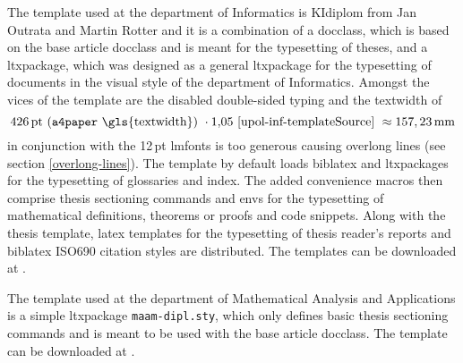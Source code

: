      The template used at the department of Informatics is KIdiplom from Jan Outrata and Martin Rotter and it is a combination of a \gls{docclass}, which is based on the base article \gls{docclass} and is meant for the typesetting of theses, and a \gls{ltxpackage}, which was designed as a general \gls{ltxpackage} for the typesetting of documents in the visual style of the department of Informatics. Amongst the vices of the template are the disabled double-sided typing \cite[lines~69--72]{upol-inf-templateSource} and the \gls{textwidth} of\begin{equation}
    426\text{\,pt}\text{ (\texttt{a4paper} \gls{textwidth}) }\cdot1{,}05\text{ \cite[line~81]{upol-inf-templateSource} }\approx157,23\text{\,mm}
  \end{equation} in conjunction with the 12\,pt \gls{lmfonts} is too generous \cite[lines~74--82]{upol-inf-templateSource} causing overlong lines (see section \ref{overlong-lines}). The template by default loads \gls{biblatex} and \glspl{ltxpackage} for the typesetting of glossaries and index. The added convenience macros then comprise thesis sectioning commands and \glspl{env} for the typesetting of mathematical definitions, theorems or proofs and code snippets. Along with the thesis template, \gls{latex} templates for the typesetting of thesis reader's reports  and \gls{biblatex} ISO\hyph{}690 \cite{iso690-1,iso690-2} citation styles \pending{} are distributed. The templates can be downloaded at \cite{upol-inf-template}.
    
  The template used at the department of Mathematical Analysis and Applications is a simple \gls{ltxpackage} \texttt{maam-dipl.sty}, which only defines basic thesis sectioning commands and is meant to be used with the base article \gls{docclass}. The template can be downloaded at \cite{upol-maam-template}.



